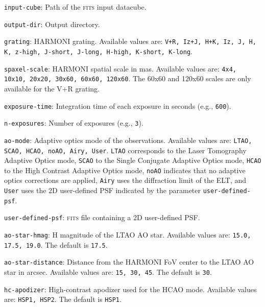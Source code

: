 \documentclass[12pt]{report}
\begin{document}
\begin{description}
\item \texttt{input-cube}: Path of the \textsc{fits} input datacube.

\item \texttt{output-dir}: Output directory.

\item \texttt{grating}: HARMONI grating. Available values are: \texttt{V+R, Iz+J, H+K, Iz, J, H, K, z-high, J-short, J-long, H-high, K-short, K-long}.

\item \texttt{spaxel-scale}: HARMONI spatial scale in mas. Available values are: \texttt{4x4, 10x10, 20x20, 30x60, 60x60, 120x60}. The 60x60 and 120x60 scales are only available for the V+R grating.

\item \texttt{exposure-time}: Integration time of each exposure in seconds (e.g., \texttt{600}).

\item \texttt{n-exposures}: Number of exposures (e.g., \texttt{3}).

\item \texttt{ao-mode}: Adaptive optics mode of the observations. Available values are: \texttt{LTAO, SCAO, HCAO, noAO, Airy, User}. \texttt{LTAO} corresponds to the Laser Tomography Adaptive Optics mode, \texttt{SCAO} to the Single Conjugate Adaptive Optics mode, \texttt{HCAO} to the High Contrast Adaptive Optics mode, \texttt{noAO} indicates that no adaptive optics corrections are applied, \texttt{Airy} uses the diffraction limit of the ELT, and \texttt{User} uses the 2D user-defined PSF indicated by the parameter \texttt{user-defined-psf}.

\item \texttt{user-defined-psf}: \textsc{fits} file containing a 2D user-defined PSF.

\item \texttt{ao-star-hmag}: H magnitude of the LTAO AO star. Available values are: \texttt{15.0, 17.5, 19.0}. The default is \texttt{17.5}.

\item \texttt{ao-star-distance}: Distance from the HARMONI FoV center to the LTAO AO star in arcsec. Available values are: \texttt{15, 30, 45}. The default is \texttt{30}.

\item \texttt{hc-apodizer}: High-contrast apodizer used for the HCAO mode. Available values are: \texttt{HSP1, HSP2}. The default is \texttt{HSP1}.


\end{description}
\end{document}
